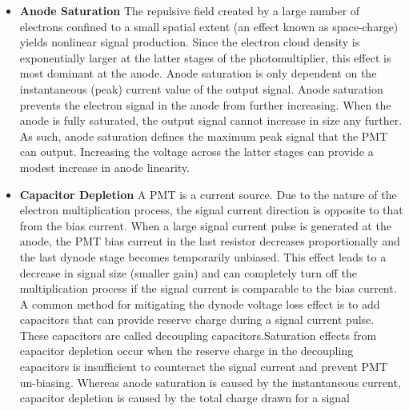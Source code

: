 \begin{itemize}
\item \textbf{Anode Saturation} The repulsive field created by a large number of electrons confined to a small spatial extent (an effect known as space-charge) yields nonlinear signal production. Since the electron cloud density is exponentially larger at the latter stages of the photomultiplier, this effect is most dominant at the anode. Anode saturation is only dependent on the instantaneous (peak) current value of the output signal. Anode saturation prevents the electron signal in the anode from further increasing. When the anode is fully saturated, the output signal cannot increase in size any further. As such, anode saturation defines the maximum peak signal that the \ac{PMT} can output. Increasing the voltage across the latter stages can provide a modest increase in anode linearity.
\item \textbf{Capacitor Depletion}  A \ac{PMT} is a current source. Due to the nature of the electron multiplication process, the signal current direction is opposite to that from the bias current. When a large signal current pulse is generated at the anode, the \ac{PMT} bias current in the last resistor decreases proportionally and the last dynode stage becomes temporarily unbiased. This effect leads to a decrease in signal size (smaller gain) and can completely turn off the multiplication process if the signal current is comparable to the bias current. A common method for mitigating the dynode voltage loss effect is to add capacitors that can provide reserve charge during a signal current pulse. These capacitors are called decoupling capacitors.Saturation effects from capacitor depletion occur when the reserve charge in the decoupling capacitors is insufficient to counteract the signal current and prevent \ac{PMT} un-biasing. Whereas anode saturation is caused by the instantaneous current, capacitor depletion is caused by the total charge drawn for a signal
 \end{itemize}

